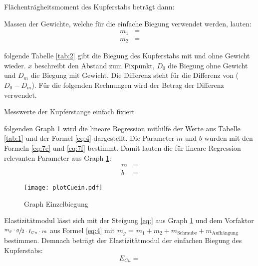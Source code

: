 \justifying Flächenträgheitsmoment des Kupferstabs beträgt dann:


\justifying Massen der Gewichte, welche für die einfache Biegung verwendet werden, lauten:
\begin{subequations}\label{eq:}
\begin{align}
    m_1 &= \text{} \label{eq:a}\\
    m_2 &= \text{} \label{eq:b}
\end{align}
\end{subequations}

\justifying folgende Tabelle \ref{tab:2} gibt die Biegung des Kupferstabs mit und ohne Gewicht wieder. $x$ beschreibt den Abstand zum Fixpunkt, $D_0$
die Biegung ohne Gewicht und $D_m$ die Biegung mit Gewicht. Die Differenz steht für die Differenz von ($D_0-D_m$). Für die folgenden Rechnungen
wird der Betrag der Differenz verwendet.
\begin{table}[H]
    \centering
    
    \caption{Messwerte der Kupferstange einfach fixiert}
    \label{tab:2}
\end{table}

\justifying folgenden Graph \ref{fig:1} wird die lineare Regression mithilfe der Werte aus Tabelle \ref{tab:1} und der Formel \eqref{eq:4} dargestellt.
Die Parameter $m$ und $b$ wurden mit den Formeln \eqref{eq:7e} und \eqref{eq:7f} bestimmt.
Damit lauten die für lineare Regression relevanten Parameter aus Graph \ref{fig:1}:
\begin{align}
    m &= \text{} \label{eq:}\\
    b &= \text{} \label{eq:}
\end{align}

\begin{figure}[H]
    \centering
    \texttt{[image: plotCuein.pdf]}
    \caption{Graph Einzelbiegung}
    \label{fig:1}
\end{figure}

\justifying Elastizitätmodul lässt sich mit der Steigung \eqref{eq:} aus Graph \ref{fig:1} und dem Vorfaktor 
$\sfrac{m_g \cdot g}{2 \cdot I_{Cu} \cdot m}$ aus Formel \eqref{eq:4} mit $m_g$ = $m_1 + m_2 + m_{\text{Schraube}} + m_{\text{Aufhängung}}$ 
bestimmen. Demnach beträgt der Elastizitätmodul der einfachen Biegung des Kupferstabs:
\begin{equation}
E_{Cu} =  \label{eq:}
\end{equation}

